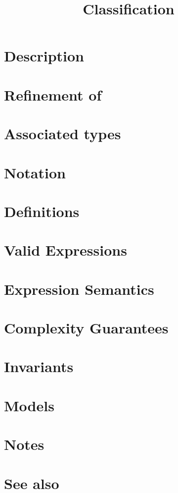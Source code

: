\documentclass{article}
\begin{document}
\title{Classification}
\maketitle

\section*{Description}
\section*{Refinement of}
\section*{Associated types}
\section*{Notation}
\section*{Definitions}
\section*{Valid Expressions}
\section*{Expression Semantics}
\section*{Complexity Guarantees}
\section*{Invariants}
\section*{Models}
\section*{Notes}
\section*{See also}




\end{document}
